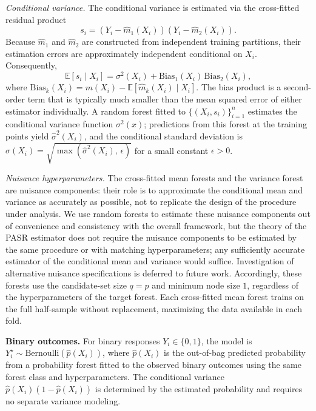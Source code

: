 \documentclass[11pt]{article}
\theoremstyle{plain}
\theoremstyle{definition}
\theoremstyle{remark}
\begin{document}
\medskip
\noindent\textit{Conditional variance.}\quad
The conditional variance is estimated via the cross-fitted residual product \citep{chernozhukov2018}
\[
s_i = (Y_i - \hat m_1(X_i))(Y_i - \hat m_2(X_i)).
\]
Because $\hat m_1$ and $\hat m_2$ are constructed from independent training partitions, their estimation errors are approximately independent conditional on $X_i$. Consequently,
\begin{equation}
	\label{eq:sprod_expectation}
	\mathbb E[s_i \mid X_i] = \sigma^2(X_i) + \mathrm{Bias}_1(X_i)\,\mathrm{Bias}_2(X_i),
\end{equation}
where $\mathrm{Bias}_k(X_i) = m(X_i) - \mathbb E[\hat m_k(X_i) \mid X_i]$. The bias product is a second-order term that is typically much smaller than the mean squared error of either estimator individually. A random forest fitted to $\{(X_i, s_i)\}_{i=1}^n$ estimates the conditional variance function $\sigma^2(x)$; predictions from this forest at the training points yield $\hat\sigma^2(X_i)$, and the conditional standard deviation is $\hat\sigma(X_i) = \sqrt{\max(\hat\sigma^2(X_i),\,\epsilon)}$ for a small constant $\epsilon > 0$.

\medskip
\noindent\textit{Nuisance hyperparameters.}\quad
The cross-fitted mean forests and the variance forest are nuisance components: their role is to approximate the conditional mean and variance as accurately as possible, not to replicate the design of the procedure under analysis. We use random forests to estimate these nuisance components out of convenience and consistency with the overall framework, but the theory of the PASR estimator does not require the nuisance components to be estimated by the same procedure or with matching hyperparameters; any sufficiently accurate estimator of the conditional mean and variance would suffice. Investigation of alternative nuisance specifications is deferred to future work. Accordingly, these forests use the candidate-set size $q = p$ and minimum node size $1$, regardless of the hyperparameters of the target forest. Each cross-fitted mean forest trains on the full half-sample without replacement, maximizing the data available in each fold.

\medskip
\noindent\textbf{Binary outcomes.}
For binary responses $Y_i\in\{0,1\}$, the model is $Y_i^\star\sim\mathrm{Bernoulli}(\hat p(X_i))$, where $\hat p(X_i)$ is the out-of-bag predicted probability from a probability forest fitted to the observed binary outcomes using the same forest class and hyperparameters. The conditional variance $\hat p(X_i)(1-\hat p(X_i))$ is determined by the estimated probability and requires no separate variance modeling.
\end{document}
